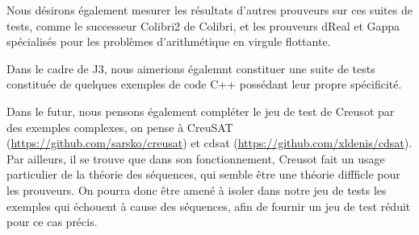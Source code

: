 \documentclass[a4paper,11pt]{article}
\begin{document}
Nous désirons également mesurer les résultats d'autres prouveurs sur ces suites
de tests, comme le successeur Colibri2 de Colibri, et les prouveurs dReal et
Gappa spécialisés pour les problèmes d'arithmétique en virgule flottante.

Dans le cadre de J3, nous aimerions égalemnt constituer une suite de tests
constituée de quelques exemples de code C++ possédant leur propre spécificité.

Dans le futur, nous pensons également compléter le jeu de test de
Creusot par des exemples complexes, on pense à CreuSAT~\cite{skotam22creusat}
(\url{https://github.com/sarsko/creusat}) et cdsat
(\url{https://github.com/xldenis/cdsat}). Par ailleurs, il se trouve
que dans son fonctionnement, Creusot fait un usage particulier de la
théorie des séquences, qui semble être une théorie diffficle pour les
prouveurs. On pourra donc être amené à isoler dans notre jeu de tests
les exemples qui échouent à cause des séquences, afin de fournir un
jeu de test réduit pour ce cas précis.

\clearpage



%
\end{document}
